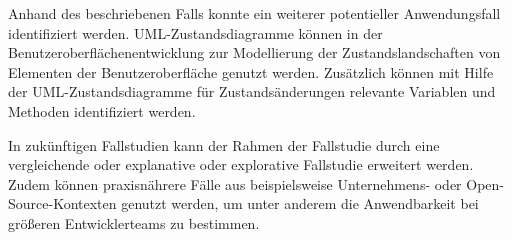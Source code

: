 \documentclass[first=Christoph,last=Hoentzsch,company=Softwareprojekt,location=Dresden,simple, noheader]{baarticle}
\begin{document}
\begin{basimple}
    Anhand des beschriebenen Falls konnte ein weiterer potentieller Anwendungsfall identifiziert werden. \gls{UML}-Zustandsdiagramme können in der Benutzeroberflächenentwicklung zur Modellierung der Zustandslandschaften von Elementen der Benutzeroberfläche genutzt werden. Zusätzlich können mit Hilfe der \gls{UML}-Zustandsdiagramme für Zustandsänderungen relevante Variablen und Methoden identifiziert werden.

    In zukünftigen Fallstudien kann der Rahmen der Fallstudie durch eine vergleichende oder explanative oder explorative Fallstudie erweitert werden. 
    Zudem können praxisnährere Fälle aus beispielsweise Unternehmens- oder Open-Source-Kontexten genutzt werden, um unter anderem die Anwendbarkeit bei größeren Entwicklerteams zu bestimmen.

    \newpage
\end{basimple}
\end{document}

